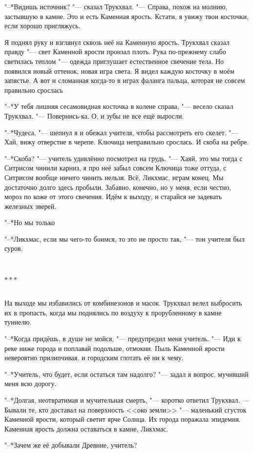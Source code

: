 \documentclass[a4paper,10pt,fleqn]{book}
\newcommand{\ldotst}{\so{...}\xspace}
\newcommand{\razd}{~\\{\centering\Large\bfseries$\ast \ast \ast$\par}~\\}
\begin{document}
"--*Видишь источник? "--- сказал Трукхвал.
"--- Справа, похож на молнию, застывшую в камне.
Это и есть Каменная ярость.
Кстати, я увижу твои косточки, если хорошо пригляжусь.

Я поднял руку и взглянул сквозь неё на Каменную ярость.
Трукхвал сказал правду "--- свет Каменной ярости пронзал плоть.
Рука по-прежнему слабо светилась теплом "--- одежда приглушает естественное свечение тела.
Но появился новый оттенок, новая игра света.
Я видел каждую косточку в моём запястье.
А вот и сломанная когда-то в играх фаланга пальца, которая не совсем правильно срослась\ldotst

"--*У тебя лишняя сесамовидная косточка в колене справа, "--- весело сказал Трукхвал.
"--- Повернись-ка.
О, и зубы не все ещё выросли.

"--*Чудеса, "--- шепнул я и обежал учителя, чтобы рассмотреть его скелет.
"--- Хай, вижу отверстие в черепе.
Ключица неправильно срослась.
И скоба на ребре.

"--*Скоба? "--- учитель удивлённо посмотрел на грудь.
"--- Хаяй, это мы тогда с Ситрисом чинили карниз, я про неё забыл совсем\ldotst
Ключица тоже оттуда, с Ситрисом вообще ничего чинить нельзя.
Всё, Ликхмас, играм конец.
Мы достаточно долго здесь пробыли.
Забавно, конечно, но у меня, если честно, мороз по коже от этого свечения.
Идём к выходу, и старайся не задевать железных зверей.

"--*Но мы только\ldotst

"--*Ликхмас, если мы чего-то боимся, то это не просто так, "--- тон учителя был суров.

\razd

На выходе мы избавились от комбинезонов и масок.
Трукхвал велел выбросить их в пропасть, когда мы поднялись по воздуху к прорубленному в камне туннелю.

"--*Когда придёшь, в душе не мойся, "--- предупредил меня учитель.
"--- Иди к реке ниже города и поплавай подольше, отмокни.
Пыль Каменной ярости невероятно прилипчивая, и городским глотать её ни к чему.

"--*Учитель, что будет, если остаться там надолго? "--- задал я вопрос, мучивший меня всю дорогу.

"--*Долгая, неотвратимая и мучительная смерть, "--- коротко ответил Трукхвал.
--- Бывали те, кто доставал на поверхность <<око земли>> "--- маленький сгусток Каменной ярости, который светит ярче Солнца.
Их города поражала эпидемия.
Каменная ярость должна оставаться в камне, Ликхмас.

"--*Зачем же её добывали Древние, учитель?
\end{document}
